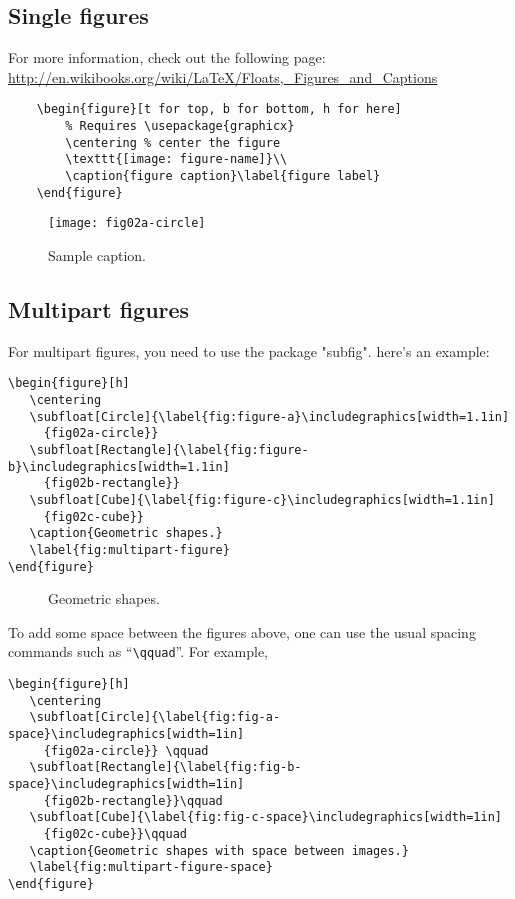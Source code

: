 \subsection{Single figures}
For more information, check out the following page: \\ \href{http://en.wikibooks.org/wiki/LaTeX/Floats,_Figures_and_Captions}{http://en.wikibooks.org/wiki/LaTeX/Floats,\_Figures\_and\_Captions}
\begin{verbatim}
    \begin{figure}[t for top, b for bottom, h for here]
        % Requires \usepackage{graphicx}
        \centering % center the figure
        \texttt{[image: figure-name]}\\
        \caption{figure caption}\label{figure label}
    \end{figure}
\end{verbatim}

\begin{figure}[h]
  \centering
  \texttt{[image: fig02a-circle]}\\
  \caption{Sample caption.}\label{label}
\end{figure} 

\subsection{Multipart figures}
For multipart figures, you need to use the package "subfig". here's an example:
\begin{verbatim}
\begin{figure}[h]
   \centering
   \subfloat[Circle]{\label{fig:figure-a}\includegraphics[width=1.1in]
     {fig02a-circle}}
   \subfloat[Rectangle]{\label{fig:figure-b}\includegraphics[width=1.1in]
     {fig02b-rectangle}}
   \subfloat[Cube]{\label{fig:figure-c}\includegraphics[width=1.1in]
     {fig02c-cube}}
   \caption{Geometric shapes.}
   \label{fig:multipart-figure}
\end{figure}
\end{verbatim}
\begin{figure}[h]
        \centering
        \caption{Geometric shapes.}
        \label{fig:multipart-figure}
\end{figure}
To add some space between the figures above, one can use the usual spacing commands such as ``\verb|\qquad|''. For example, 
\begin{verbatim}
\begin{figure}[h]
   \centering
   \subfloat[Circle]{\label{fig:fig-a-space}\includegraphics[width=1in]
     {fig02a-circle}} \qquad
   \subfloat[Rectangle]{\label{fig:fig-b-space}\includegraphics[width=1in]
     {fig02b-rectangle}}\qquad
   \subfloat[Cube]{\label{fig:fig-c-space}\includegraphics[width=1in]
     {fig02c-cube}}\qquad
   \caption{Geometric shapes with space between images.}
   \label{fig:multipart-figure-space}
\end{figure} 
\end{verbatim}

